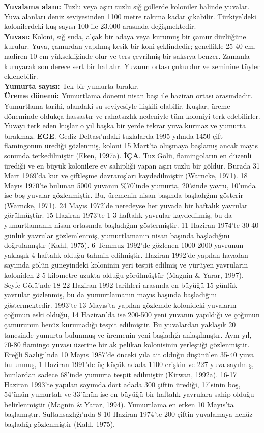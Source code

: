 \documentclass[
  a4paper,
  DIV=11,
  numbers=noendperiod]{scrreprt}
\begin{document}
\textbf{Yuvalama alanı:} Tuzlu veya aşırı tuzlu sığ göllerde koloniler
halinde yuvalar. Yuva alanları deniz seviyesinden 1100 metre rakıma
kadar çıkabilir. Türkiye'deki kolonilerdeki kuş sayısı 100 ile 23.000
arasında değişmektedir.\\
\textbf{Yuvası:} Koloni, sığ suda, alçak bir adaya veya kurumuş bir
çamur düzlüğüne kurulur. Yuva, çamurdan yapılmış kesik bir koni
şeklindedir; genellikle 25-40 cm, nadiren 10 cm yüksekliğinde olur ve
ters çevrilmiş bir saksıya benzer. Zamanla kuruyarak son derece sert bir
hal alır. Yuvanın ortası çukurdur ve zeminine tüyler eklenebilir.\\
\textbf{Yumurta sayısı:} Tek bir yumurta bırakır.\\
\textbf{Üreme dönemi:} Yumurtlama dönemi nisan başı ile haziran ortası
arasındadır. Yumurtlama tarihi, alandaki su seviyesiyle ilişkili
olabilir. Kuşlar, üreme döneminde oldukça hassastır ve rahatsızlık
nedeniyle tüm koloniyi terk edebilirler. Yuvayı terk eden kuşlar o yıl
başka bir yerde tekrar yuva kurmaz ve yumurta bırakmaz. \textbf{EGE}.
Gediz Deltası'ndaki tuzlalarda 1995 yılında 1450 çift flamingonun
ürediği gözlenmiş, koloni 15 Mart'ta oluşmaya başlamış ancak mayıs
sonunda terkedilmiştir (Eken, 1997a). \textbf{İÇA}. Tuz Gölü,
flamingoların en düzenli ürediği ve en büyük kolonilere ev sahipliği
yapan aşırı tuzlu bir göldür. Burada 31 Mart 1969'da kur ve çiftleşme
davranışları kaydedilmiştir (Warncke, 1971). 18 Mayıs 1970'te bulunan
5000 yuvanın \%70'inde yumurta, 20'sinde yavru, 10'unda ise boş yuvalar
gözlenmiştir. Bu, üremenin nisan başında başladığını gösterir (Warncke,
1971). 24 Mayıs 1972'de neredeyse her yuvada bir haftalık yavrular
görülmüştür. 15 Haziran 1973'te 1-3 haftalık yavrular kaydedilmiş, bu da
yumurtlamanın nisan ortasında başladığını göstermiştir. 11 Haziran
1974'te 30-40 günlük yavrular gözlemlenmiş, yumurtlamanın nisan başında
başladığını doğrulamıştır (Kahl, 1975). 6 Temmuz 1992'de gözlenen
1000-2000 yavrunun yaklaşık 4 haftalık olduğu tahmin edilmiştir. Haziran
1992'de yapılan havadan sayımda gölün güneyindeki koloninin yeri tespit
edilmiş ve yürüyen yavruların koloniden 2-5 kilometre uzakta olduğu
görülmüştür (Magnin \& Yarar, 1997). Seyfe Gölü'nde 18-22 Haziran 1992
tarihleri arasında en büyüğü 15 günlük yavrular gözlenmiş, bu da
yumurtlamanın mayıs başında başladığını göstermektedir. 1993'te 13
Mayıs'ta yapılan gözlemde kolonideki yuvaların çoğunun eski olduğu, 14
Haziran'da ise 200-500 yeni yuvanın yapıldığı ve çoğunun çamurunun henüz
kurumadığı tespit edilmiştir. Bu yuvalardan yaklaşık 20 tanesinde
yumurta bulunmuş ve üremenin yeni başladığı anlaşılmıştır. Aynı yıl,
70-80 flamingo yuvası üzerine bir ak pelikan kolonisinin yerleştiği
gözlenmiştir. Ereğli Sazlığı'nda 10 Mayıs 1987'de önceki yıla ait olduğu
düşünülen 35-40 yuva bulunmuş, 1 Haziran 1991'de üç küçük adada 1100
erişkin ve 227 yuva sayılmış, bunlardan sadece 68'inde yumurta tespit
edilmiştir (Kirwan, 1992a). 16-17 Haziran 1993'te yapılan sayımda dört
adada 300 çiftin ürediği, 17'sinin boş, 54'ünün yumurtalı ve 33'ünün ise
en büyüğü bir haftalık yavrulara sahip olduğu belirlenmiştir (Magnin \&
Yarar, 1994). Yumurtlama en erken 10 Mayıs'ta başlamıştır.
Sultansazlığı'nda 8-10 Haziran 1974'te 200 çiftin yuvalamaya henüz
başladığı gözlenmiştir (Kahl, 1975).
\end{document}
